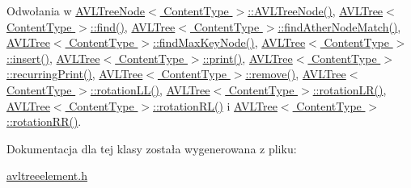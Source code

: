 Odwołania w \hyperlink{avltreeelement_8h_source_l00027}{A\-V\-L\-Tree\-Node$<$ Content\-Type $>$\-::\-A\-V\-L\-Tree\-Node()}, \hyperlink{avltree_8h_source_l00250}{A\-V\-L\-Tree$<$ Content\-Type $>$\-::find()}, \hyperlink{avltree_8h_source_l00271}{A\-V\-L\-Tree$<$ Content\-Type $>$\-::find\-Ather\-Node\-Match()}, \hyperlink{avltree_8h_source_l00264}{A\-V\-L\-Tree$<$ Content\-Type $>$\-::find\-Max\-Key\-Node()}, \hyperlink{avltree_8h_source_l00049}{A\-V\-L\-Tree$<$ Content\-Type $>$\-::insert()}, \hyperlink{avltree_8h_source_l00389}{A\-V\-L\-Tree$<$ Content\-Type $>$\-::print()}, \hyperlink{avltree_8h_source_l00382}{A\-V\-L\-Tree$<$ Content\-Type $>$\-::recurring\-Print()}, \hyperlink{avltree_8h_source_l00289}{A\-V\-L\-Tree$<$ Content\-Type $>$\-::remove()}, \hyperlink{avltree_8h_source_l00166}{A\-V\-L\-Tree$<$ Content\-Type $>$\-::rotation\-L\-L()}, \hyperlink{avltree_8h_source_l00222}{A\-V\-L\-Tree$<$ Content\-Type $>$\-::rotation\-L\-R()}, \hyperlink{avltree_8h_source_l00195}{A\-V\-L\-Tree$<$ Content\-Type $>$\-::rotation\-R\-L()} i \hyperlink{avltree_8h_source_l00137}{A\-V\-L\-Tree$<$ Content\-Type $>$\-::rotation\-R\-R()}.



Dokumentacja dla tej klasy została wygenerowana z pliku\-:\begin{DoxyCompactItemize}
\item 
\hyperlink{avltreeelement_8h}{avltreeelement.\-h}\end{DoxyCompactItemize}
